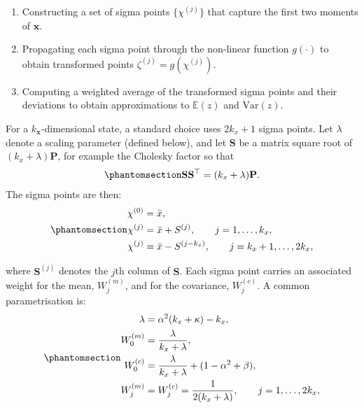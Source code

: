 \documentclass[
  letterpaper,
  DIV=11,
  numbers=noendperiod]{scrreprt}
\providecommand{\tightlist}{%
  \setlength{\itemsep}{0pt}\setlength{\parskip}{0pt}}
\begin{document}
\begin{enumerate}
\def\labelenumi{\arabic{enumi}.}
\tightlist
\item
  Constructing a set of sigma points \(\{\chi^{(j)}\}\) that capture the
  first two moments of \(\mathbf{x}\).
\item
  Propagating each sigma point through the non-linear function
  \(g(\cdot)\) to obtain transformed points
  \(\zeta^{(j)} = g(\chi^{(j)})\).
\item
  Computing a weighted average of the transformed sigma points and their
  deviations to obtain approximations to \(\mathbb{E}(z)\) and
  \(\mathrm{Var}(z)\).
\end{enumerate}

For a \(k_{\mathbf{x}}\)-dimensional state, a standard choice uses
\(2 k_x + 1\) sigma points. Let \(\lambda\) denote a scaling parameter
(defined below), and let \(\mathbf{S}\) be a matrix square root of
\((k_x + \lambda) \mathbf{P}\), for example the Cholesky factor so that
\begin{equation}\protect\phantomsection\label{eq-gen-0137}{
\begin{align}
    \mathbf{S}\mathbf{S}^{\top} = (k_x + \lambda) \mathbf{P}.
\end{align}
}\end{equation} The sigma points are then:
\begin{equation}\protect\phantomsection\label{eq-gen-0138}{
\begin{align}
    \chi^{(0)} &= \bar{x}, \\
    \chi^{(j)} &= \bar{x} + S^{(j)}, \qquad j = 1, \ldots, k_x, \\
    \chi^{(j)} &= \bar{x} - S^{(j-k_x)}, \qquad j = k_x + 1, \ldots, 2 k_x, 
\end{align}
}\end{equation}

where \(\mathbf{S}^{(j)}\) denotes the \(j\)th column of \(\mathbf{S}\).
Each sigma point carries an associated weight for the mean,
\(W^{(m)}_j\), and for the covariance, \(W^{(c)}_j\). A common
parametrisation is:
\begin{equation}\protect\phantomsection\label{eq-gen-0139}{
\begin{align}
\lambda &= \alpha^2 (k_x + \kappa) - k_x, \\
    W^{(m)}_0 &= \frac{\lambda}{k_x + \lambda}, \\
    W^{(c)}_0 &= \frac{\lambda}{k_x + \lambda} + (1 - \alpha^2 + \beta), \\
    W^{(m)}_j &= W^{(c)}_j = \frac{1}{2 (k_x + \lambda)}, \qquad j = 1, \ldots, 2 k_x, 
\end{align}
}\end{equation}
\end{document}
